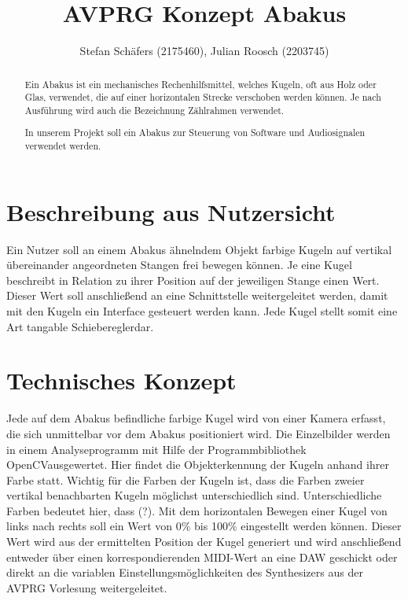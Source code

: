 \documentclass[12pt]{Article}
\title{AVPRG Konzept \glqq Abakus\grqq}
\author{ Stefan Schäfers (2175460), Julian Roosch (2203745)}
\begin{document}
\maketitle
\begin{abstract}
Ein Abakus ist ein mechanisches Rechenhilfsmittel, welches Kugeln, oft aus Holz oder Glas, verwendet, die auf einer horizontalen Strecke verschoben werden können. Je nach Ausführung wird auch die Bezeichnung Zählrahmen verwendet.

In unserem Projekt soll ein Abakus zur Steuerung von Software und Audiosignalen verwendet werden.
\end{abstract}
\section{Beschreibung aus Nutzersicht}
Ein Nutzer soll an einem Abakus ähnelndem Objekt farbige Kugeln auf vertikal übereinander angeordneten Stangen frei bewegen können. Je eine Kugel beschreibt in Relation zu ihrer Position auf der jeweiligen Stange einen Wert. Dieser Wert soll anschließend an eine Schnittstelle weitergeleitet werden, damit mit den Kugeln ein Interface gesteuert werden kann. Jede Kugel stellt somit eine Art \glqq tangable Schieberegler\grqq dar.


\section{Technisches Konzept}
Jede auf dem Abakus befindliche farbige Kugel wird von einer Kamera erfasst, die sich unmittelbar vor dem Abakus positioniert wird. Die Einzelbilder werden in einem Analyseprogramm mit Hilfe der Programmbibliothek \glqq OpenCV\grqq ausgewertet. Hier findet die Objekterkennung der Kugeln anhand ihrer Farbe statt. Wichtig für die Farben der Kugeln ist, dass die Farben zweier vertikal benachbarten Kugeln möglichst unterschiedlich sind. Unterschiedliche Farben bedeutet hier, dass (?). Mit dem horizontalen Bewegen einer Kugel von links nach rechts soll ein Wert von 0\% bis 100\% eingestellt werden können. Dieser Wert wird aus der ermittelten Position der Kugel generiert und wird anschließend entweder über einen korrespondierenden MIDI-Wert an eine DAW geschickt oder direkt an die variablen Einstellungsmöglichkeiten des Synthesizers aus der AVPRG Vorlesung weitergeleitet.
\end{document}
